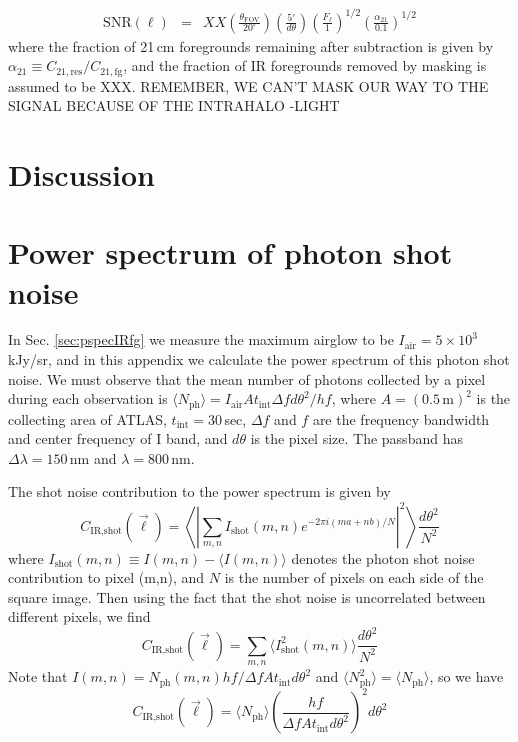 \documentclass[preprint]{aastex}
\newcommand{\IR}{\text{IR}}
\newcommand{\fg}{\text{fg}}
\newcommand{\res}{\text{res}}
\newcommand{\shot}{\text{shot}}
\newcommand{\SNR}{\text{SNR}}
\begin{document}
\begin{eqnarray}
	\SNR(\ell)&=&XX \left(\frac{\theta_\text{FOV}}{20^\circ}\right)\left(\frac{5'}{d\theta}\right)\left(\frac{F_\ell}{1}\right)^{1/2}\left(\frac{\alpha_{21}}{0.1}\right)^{1/2}
\end{eqnarray}
where the fraction of 21\,cm foregrounds remaining after subtraction is given by $\alpha_{21}\equiv C_{21,\res}/C_{21,\fg}$, and the fraction of IR foregrounds removed by masking is assumed to be XXX. REMEMBER, WE CAN'T MASK OUR WAY TO THE SIGNAL BECAUSE OF THE INTRAHALO
-LIGHT






\section{Discussion}

\appendix

\section{Power spectrum of photon shot noise}
\label{sec:Pshot}

In Sec. \ref{sec:pspecIRfg} we measure the maximum airglow to be $I_\text{air}=5\times10^3$ kJy/sr, and in this appendix we calculate the power spectrum of this photon shot noise. We must observe that the mean number of photons collected by a pixel during each observation is $\langle N_\text{ph}\rangle=I_\text{air}At_\text{int} \Delta f d\theta^2/hf$, where $A=(0.5\,\text{m})^2$ is the collecting area of ATLAS, $t_\text{int}=30\,$sec, $\Delta f$ and $f$ are the frequency bandwidth and center frequency of I band, and $d\theta$ is the pixel size. The passband has $\Delta\lambda=150\,$nm and $\lambda=800\,$nm. 

The shot noise contribution to the power spectrum is given by
\begin{equation}
C_{\IR, \shot}(\vec{\ell}) = \left\langle\left|\sum_{m,n}I_\shot(m,n)e^{-2\pi i(ma+nb)/N}\right|^2\right\rangle \frac{d\theta^2}{N^2}
\end{equation}
where $I_\shot(m,n)\equiv I(m,n)-\langle I(m,n)\rangle$ denotes the photon shot noise contribution to pixel (m,n), and $N$ is the number of pixels on each side of the square image. Then using the fact that the shot noise is uncorrelated between different pixels, we find
\begin{equation}
C_{\IR, \shot}(\vec{\ell}) = \sum_{m,n}\langle I^2_\shot(m,n)\rangle \frac{d\theta^2}{N^2}
\end{equation}
Note that $I(m,n)=N_\text{ph}(m,n)hf/\Delta f A t_\text{int}d\theta^2$ and $\langle N_\text{ph}^2\rangle = \langle N_\text{ph}\rangle$, so we have
\begin{equation}
C_{\IR, \shot}(\vec{\ell}) = \langle N_\text{ph}\rangle \left(\frac{hf}{\Delta f A t_\text{int}d\theta^2}\right)^2 d\theta^2
\end{equation}
\end{document}
